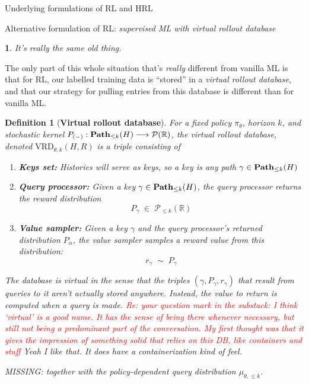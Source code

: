 \documentclass[11pt]{article}
\newtheorem{definition}[subsubsection]{Definition}
\newtheorem{ermark}[subsubsection]{}
\begin{document}
\begin{section}{Underlying formulations of RL and HRL}
\begin{subsection}{Alternative formulation of RL: {\em supervised ML with virtual rollout database}}
\begin{ermark}
It’s really the same old thing. 
\end{ermark}

The only part of this whole situation that’s {\em really} different from vanilla ML is that for RL, our labelled training data is ``stored'' in a {\em virtual rollout database}, and that our strategy for pulling entries from this database is different than for vanilla ML.

\begin{definition}[{\bf Virtual rollout database}]
\normalfont
For a fixed policy $\pi_\theta$, horizon $k$, and stochastic kernel $P_{(-)}:\bold{Path}_{\le k}(H)\longrightarrow\mathcal{P}(\mathbb{R})$, the {\em virtual rollout database}, denoted $\text{VRD}_{\theta,k}(H,R)$ is a triple  consisting of
\begin{enumerate}
\item {\bf Keys set:} Histories will serve as {\em keys}, so a key is any path $\gamma\in\bold{Path}_{\le k}(H)$
\item {\bf Query processor:} Given a key $\gamma\in\bold{Path}_{\le k}(H)$, the {\em query processor} returns the reward distribution
$$
P_{\gamma}\;\in\;\mathcal{P}_{\le k}(\mathbb{R})
$$
\item {\bf Value sampler:} Given a key $\gamma$ and the query processor's returned distribution $P_{\alpha}$, the {\em value sampler} samples a reward value from this distribution:
$$
r_{\gamma}\;\sim\;P_{\gamma}
$$
\end{enumerate}
The database is {\em virtual} in the sense that the triples $(\gamma,P_{\gamma},r_\gamma)$ that result from queries to it aren't actually stored anywhere. Instead, the value to return is computed when a query is made. 
\textcolor{red}{Re: your question mark in the substack: I think `virtual' is a good name. It has the sense of being there whenever necessary, but still not being a predominant part of the conversation. My first thought was that it gives the impression of something solid that relies on this DB, like containers and stuff} {\color{blue} Yeah I like that. It does have a containerization kind of feel.}

{\color{blue} MISSING: together with the policy-dependent query distribution $\mu_{\theta,\le k}$. }
\end{definition}

\end{subsection}


\end{section}
\end{document}
